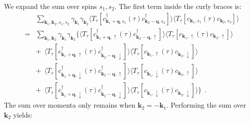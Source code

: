 \documentclass[a4j]{jsarticle}
\begin{document}
We expand the sum over spins $s_{1},s_{2}$.
The first term inside the curly braces is:
%
%
%
%
\begin{eqnarray}
	&&
	\sum_{\bm{k}_{1} , \bm{k}_{2} , s_{1} ,s_{2} }
	\gamma_{\bm{k}_{1}}
	\gamma_{\bm{k}_{2}}
	\langle T_{\tau} [
			c_{ \bm{k}_{1}+\bm{q} , s_{1} }^{\dagger} (\tau)
			c_{ \bm{k}_{2}-\bm{q} , s_{2} }^{\dagger}
		] \rangle
	\langle T_{\tau} [
			c_{ \bm{k}_{1} , s_{1} } (\tau)
			c_{ \bm{k}_{2} , s_{2} }
		] \rangle
	\\ &=&
	\sum_{\bm{k}_{1} , \bm{k}_{2} }
	\gamma_{\bm{k}_{1}}
	\gamma_{\bm{k}_{2}}
	\Big\{
	\langle T_{\tau} [
			c_{ \bm{k}_{1}+\bm{q} , \uparrow }^{\dagger} (\tau)
			c_{ \bm{k}_{2}-\bm{q} , \uparrow }^{\dagger}
		] \rangle
	\langle T_{\tau} [
			c_{ \bm{k}_{1} , \uparrow } (\tau)
			c_{ \bm{k}_{2} , \uparrow }
		] \rangle
	\nonumber \\ && + \ \
	\langle T_{\tau} [
			c_{ \bm{k}_{1}+\bm{q} , \uparrow }^{\dagger} (\tau)
			c_{ \bm{k}_{2}-\bm{q} , \downarrow }^{\dagger}
		] \rangle
	\langle T_{\tau} [
			c_{ \bm{k}_{1} , \uparrow } (\tau)
			c_{ \bm{k}_{2} , \downarrow }
		] \rangle
	\nonumber \\[2mm] && + \ \
	\langle T_{\tau} [
			c_{ \bm{k}_{1}+\bm{q} , \downarrow }^{\dagger} (\tau)
			c_{ \bm{k}_{2}-\bm{q} , \uparrow }^{\dagger}
		] \rangle
	\langle T_{\tau} [
			c_{ \bm{k}_{1} , \downarrow } (\tau)
			c_{ \bm{k}_{2} , \uparrow }
		] \rangle
	\nonumber \\[2mm] && + \ \
	\langle T_{\tau} [
			c_{ \bm{k}_{1}+\bm{q} , \downarrow }^{\dagger} (\tau)
			c_{ \bm{k}_{2}-\bm{q} , \downarrow }^{\dagger}
		] \rangle
	\langle T_{\tau} [
			c_{ \bm{k}_{1} , \downarrow } (\tau)
			c_{ \bm{k}_{2} , \downarrow }
		] \rangle
	\Big\}
	\ \ .
\end{eqnarray}
%
%
%
%
The sum over momenta only remains when $\bm{k}_{2}=-\bm{k}_{1}$.
Performing the sum over $\bm{k}_{2}$ yields:
%
%
%
%
\end{document}
